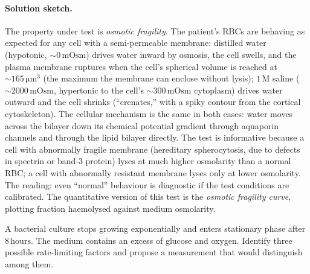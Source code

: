 \paragraph{Solution sketch.}
The property under test is \emph{osmotic fragility}. The patient's
RBCs are behaving as expected for any cell with a semi-permeable
membrane: distilled water (hypotonic, $\sim 0\,\text{mOsm}$) drives
water inward by osmosis, the cell swells, and the plasma membrane
ruptures when the cell's spherical volume is reached at
$\sim 165\,\si{\micro\meter}^3$ (the maximum the membrane can
enclose without lysis); $1\,\text{M}$ saline ($\sim 2000\,\text{mOsm}$,
hypertonic to the cell's $\sim 300\,\text{mOsm}$ cytoplasm) drives
water outward and the cell shrinks (``crenates,'' with a spiky
contour from the cortical cytoskeleton). The cellular mechanism is
the same in both cases: water moves across the bilayer down its
chemical potential gradient through aquaporin channels and through
the lipid bilayer directly. The test is informative because a cell
with abnormally fragile membrane (hereditary spherocytosis, due to
defects in spectrin or band-3 protein) lyses at much higher
osmolarity than a normal RBC; a cell with abnormally resistant
membrane lyses only at lower osmolarity. The reading: even ``normal''
behaviour is diagnostic if the test conditions are calibrated. The
quantitative version of this test is the \emph{osmotic fragility
curve}, plotting fraction haemolysed against medium osmolarity.

\begin{exercise}
A bacterial culture stops growing exponentially and enters stationary
phase after $8\,\text{hours}$. The medium contains an excess of
glucose and oxygen. Identify three possible rate-limiting factors and
propose a measurement that would distinguish among them.
\end{exercise}

